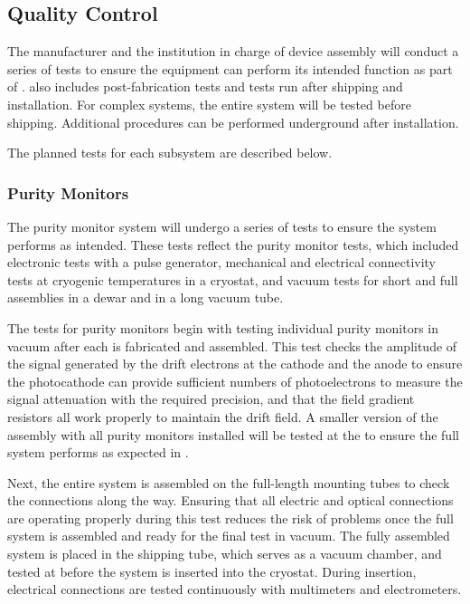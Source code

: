\subsection{Quality Control}
\label{sec:fdsp-slow-cryo-qc}
The manufacturer and the institution in charge of device assembly will conduct a series of tests to ensure the equipment can perform its intended function as part of .  also includes post-fabrication tests and tests run after shipping and installation. For complex systems, the entire system will be tested before shipping. 
Additional  procedures can be performed %
underground after installation. %

The planned tests for each subsystem are described below.  


\subsubsection{Purity Monitors}
\label{sec:fdgen-slow-cryo-qc-pm}


The purity monitor system will undergo a series of tests to ensure the
system performs as intended. These tests reflect the 
purity monitor  tests, which included electronic tests
with a pulse generator, mechanical and electrical connectivity tests
at cryogenic temperatures in a cryostat, and vacuum tests for short
and full assemblies in a dewar and in a long vacuum tube.

The  tests for  purity monitors begin with testing
individual purity monitors in vacuum after each is fabricated and
assembled.  This test checks the amplitude of the signal generated by
the drift electrons at the cathode and the anode to ensure the
photocathode can provide sufficient numbers of photoelectrons to
measure the signal attenuation
with the required precision, and that the field gradient resistors all work properly to maintain the drift field. %
A smaller version of the assembly with all purity monitors installed will be  tested at the  %
to ensure the full system performs as expected in .  

Next, %
the entire system %
is assembled on the full-length mounting tubes to check the connections along the way.  Ensuring that all electric and optical connections are operating properly during this test reduces the risk of problems once the full system is assembled and ready for the final test in vacuum.  %
The fully assembled system %
is placed in the shipping tube, which %
serves as a vacuum chamber, and tested at \surf %
 before the system is inserted into the  %
 cryostat. During insertion, electrical connections %
 are tested continuously with multimeters and electrometers.



